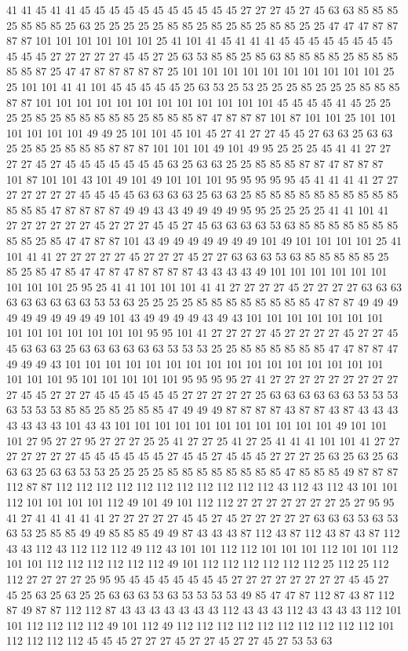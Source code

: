 41 41 45 41 41 45 45 45 45 45 45 45 45 45 45 45 27 27 27 45 27 45 63 63 85 85 85 25 85 85 85 25 63 25 25 25 25 25 85 85 25 85 25 85 25 85 85 25 25 47 47 47 87 87 87 87 101 101 101 101 101 101 25 41 101 41 45 41 41 41 45 45 45 45 45 45 45 45 45 45 45 27 27 27 27 27 45 45 27 25 63 53 85 85 25 85 63 85 85 85 85 25 85 85 85 85 85 87 25 47 47 87 87 87 87 87 25 101 101 101 101 101 101 101 101 101 101 25 25 101 101 41 41 101 45 45 45 45 45 25 63 53 25 53 25 25 25 85 25 25 25 85 85 85 87 87 101 101 101 101 101 101 101 101 101 101 101 101 45 45 45 45 41 45 25 25 25 25 85 25 85 85 85 85 85 25 85 85 85 87 47 87 87 87 101 87 101 101 25 101 101 101 101 101 101 49 49 25 101 101 45 101 45 27 41 27 27 45 45 27 63 63 25 63 63 25 25 85 25 85 85 85 87 87 87 101 101 101 49 101 49 95 25 25 25 45 41 41 27 27 27 27 45 27 45 45 45 45 45 45 45 63 25 63 63 25 25 85 85 85 87 87 47 87 87 87 101 87 101 101 43 101 49 101 49 101 101 101 95 95 95 95 95 45 41 41 41 41 27 27 27 27 27 27 27 45 45 45 45 63 63 63 63 25 63 63 25 85 85 85 85 85 85 85 85 85 85 85 85 85 47 87 87 87 87 49 49 43 43 49 49 49 49 95 95 25 25 25 25 41 41 101 41 27 27 27 27 27 27 45 27 27 27 45 45 27 45 63 63 63 63 53 63 85 85 85 85 85 85 85 85 85 25 85 47 47 87 87 101 43 49 49 49 49 49 49 49 101 49 101 101 101 101 25 41 101 41 41 27 27 27 27 27 45 27 27 27 45 27 27 63 63 63 53 63 85 85 85 85 85 25 85 25 85 47 85 47 47 87 47 87 87 87 87 43 43 43 43 49 101 101 101 101 101 101 101 101 101 25 95 25 41 41 101 101 101 41 41 27 27 27 27 45 27 27 27 27 63 63 63 63 63 63 63 63 63 53 53 63 25 25 25 25 85 85 85 85 85 85 85 85 47 87 87 49 49 49 49 49 49 49 49 49 49 101 43 49 49 49 49 43 49 43 101 101 101 101 101 101 101 101 101 101 101 101 101 101 95 95 101 41 27 27 27 27 45 27 27 27 27 45 27 27 45 45 63 63 63 25 63 63 63 63 63 63 53 53 53 25 25 85 85 85 85 85 85 47 47 87 87 47 49 49 49 43 101 101 101 101 101 101 101 101 101 101 101 101 101 101 101 101 101 101 101 95 101 101 101 101 101 95 95 95 95 27 41 27 27 27 27 27 27 27 27 27 27 45 45 27 27 27 45 45 45 45 45 45 27 27 27 27 27 25 63 63 63 63 63 63 53 53 53 63 53 53 53 85 85 25 85 25 85 85 47 49 49 49 87 87 87 87 43 87 87 43 87 43 43 43 43 43 43 43 101 43 43 101 101 101 101 101 101 101 101 101 101 101 49 101 101 101 27 95 27 27 95 27 27 27 25 25 41 27 27 25 41 27 25 41 41 41 101 101 41 27 27 27 27 27 27 27 45 45 45 45 45 45 27 45 45 27 45 45 45 27 27 27 25 63 25 63 25 63 63 63 25 63 63 53 53 25 25 25 25 85 85 85 85 85 85 85 85 47 85 85 85 49 87 87 87 112 87 87 112 112 112 112 112 112 112 112 112 112 112 43 112 43 112 43 101 101 112 101 101 101 101 112 49 101 49 101 112 112 27 27 27 27 27 27 27 25 27 95 95 41 27 41 41 41 41 41 27 27 27 27 27 45 45 27 45 27 27 27 27 27 63 63 63 53 63 53 63 53 25 85 85 49 49 85 85 85 49 49 87 43 43 43 87 112 43 87 112 43 87 43 87 112 43 43 112 43 112 112 112 49 112 43 101 101 112 112 101 101 101 112 101 101 112 101 101 112 112 112 112 112 112 49 101 112 112 112 112 112 112 25 112 25 112 112 27 27 27 27 25 95 95 45 45 45 45 45 45 45 27 27 27 27 27 27 27 27 45 45 27 45 25 63 25 63 25 25 63 63 63 53 63 53 53 53 53 49 85 47 47 87 112 87 43 87 112 87 49 87 87 112 112 87 43 43 43 43 43 43 43 112 43 43 43 112 43 43 43 43 112 101 101 112 112 112 112 49 101 112 49 112 112 112 112 112 112 112 112 112 112 101 112 112 112 112 45 45 45 27 27 27 45 27 27 45 27 27 45 27 53 53 63 